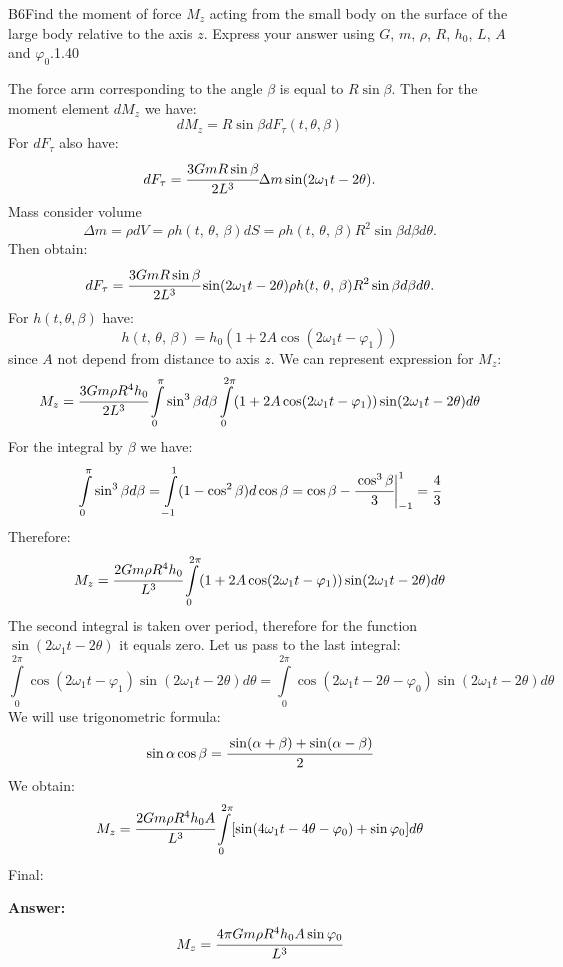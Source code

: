 \documentclass[11pt,a4paper]{article}
\begin{document}
\begin{solcard}{B6}{Find the moment of force $M_z$ acting from the small body on the surface of the large body relative to the axis $z$. Express your answer using $G$, $m$, $\rho$, $R$, $h_0$, $L$, $A$ and $\varphi_0$.}{1.40}

The force arm corresponding to the angle $\beta$ is equal to $R\sin\beta$. Then for the moment element $dM_z$ we have: $$dM_z=R\sin\beta dF_\tau(t{,}\theta{,}\beta) $$ For $dF_\tau$ also have: $$dF_\tau=\cfrac{3GmR\sin\beta}{2L^3} \Delta m \sin(2\omega_1t-2\theta). $$ Mass consider volume $$ \Delta m = \rho dV = \rho h(t,\, \theta,\, \beta) dS = \rho h(t,\, \theta,\, \beta) R^2 \sin \beta d\beta d\theta. $$ Then obtain: $$dF_\tau=\cfrac{3GmR\sin\beta}{2L^3}  \sin(2\omega_1t-2\theta) \rho h(t,\, \theta,\, \beta) R^2 \sin \beta d\beta d\theta. $$ For $h(t{, }\theta{,}\beta)$ have: $$h(t,\,\theta,\,\beta)=h_0(1+2A\cos(2\omega_1t-\varphi_1)) $$ since $A$ not depend from distance to axis $z$. We can represent expression for $M_z$: $$M_z=\cfrac{3Gm\rho R^4h_0}{2L^3}\int\limits_0^{\pi}\sin^3\beta d\beta\int\limits_0^{2\pi}(1+2A\cos(2\omega_1t-\varphi_1))\sin(2\omega_1t-2\theta)d\theta $$ For the integral by $\beta$ we have: $$\int\limits_0^{\pi}\sin^3\beta d\beta=\int\limits_{-1}^{1}(1-\cos^2\beta)d\cos\beta=\cos\beta-\cfrac{\cos^3\beta}{3}\bigg|_{-1}^{1}=\cfrac{4}{3} $$ Therefore: $$M_z=\cfrac{2Gm\rho R^4h_0}{L^3}\int\limits_0^{2\pi}(1+2A\cos(2\omega_1t-\varphi_1))\sin(2\omega_1t-2\theta)d\theta $$ The second integral is taken over period, therefore for the function $\sin(2 \omega_1t-2\theta)$ it equals zero. Let us pass to the last integral: $$\int\limits_0^{2\pi}\cos(2\omega_1t-\varphi_1)\sin(2\omega_1t-2\theta)d\theta=\int\limits_0^{2\pi}\cos(2\omega_1t-2\theta-\varphi_0)\sin(2\omega_1t-2\theta)d\theta $$ We will use trigonometric formula: $$\sin\alpha\cos\beta=\cfrac{\sin(\alpha+\beta)+\sin(\alpha-\beta)}{2} $$ We obtain: $$M_z=\cfrac{2Gm\rho R^4h_0A}{L^3}\int\limits_0^{2\pi}[\sin(4\omega_1t-4\theta-\varphi_0)+\sin\varphi_0]d\theta $$ Final:

\par\smallskip\noindent\textbf{Answer:} $$M_z=\cfrac{4\pi Gm\rho R^4h_0A\sin\varphi_0}{L^3} $$
\end{solcard}
\end{document}
